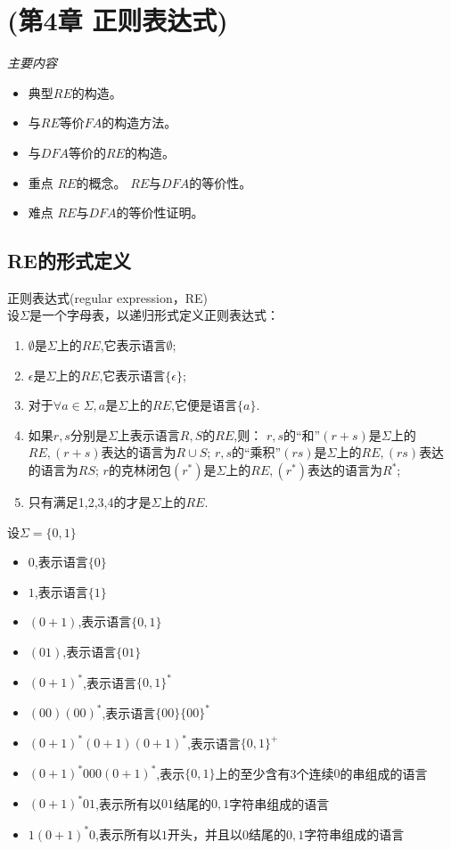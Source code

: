 \chapter{\cite{蒋宗礼2013}(第4章 正则表达式)}

\emph{主要内容}
\begin{itemize}
	\item 典型$RE$的构造。
	\item 与$RE$等价$FA$的构造方法。
	\item 与$DFA$等价的$RE$的构造。
	\item 重点
		\subitem{-} $RE$的概念。
		\subitem{-} $RE$与$DFA$的等价性。
	\item 难点
	    \subitem{-} $RE$与$DFA$的等价性证明。 
\end{itemize}

\section{RE的形式定义}
\begin{definition}\label{RE_Def} 正则表达式(regular expression，RE)\\
	设$\Sigma$是一个字母表，以递归形式定义正则表达式：
	\begin{enumerate}
		\item $\emptyset$是$\Sigma$上的$RE$,它表示语言$\emptyset$;
		\item $\epsilon$是$\Sigma$上的$RE$,它表示语言$\{\epsilon\}$;
		\item 对于$\forall a\in\Sigma,a$是$\Sigma$上的$RE$,它便是语言$\{a\}$.
		\item 如果$r,s$分别是$\Sigma$上表示语言$R,S$的$RE$,则：
			\subitem $r,s$的“和”$(r+s)$是$\Sigma$上的$RE,(r+s)$表达的语言为$R\cup S$;
			\subitem $r,s$的“乘积”$(rs)$是$\Sigma$上的$RE,(rs)$表达的语言为$RS$;
			\subitem $r$的克林闭包$(r^\ast)$是$\Sigma$上的$RE,(r^\ast)$表达的语言为$R^\ast$;
		\item 只有满足1,2,3,4的才是$\Sigma$上的$RE$.
	\end{enumerate}
\end{definition}

\begin{example} 设$\Sigma=\{0,1\}$
	\begin{itemize}
		\item $0$,表示语言$\{0\}$
		\item $1$,表示语言$\{1\}$
		\item $(0+1)$,表示语言$\{0,1\}$
		\item $(01)$,表示语言$\{01\}$
		\item $(0+1)^\ast$,表示语言$\{0,1\}^\ast$
		\item $(00)(00)^\ast$,表示语言$\{00\}\{00\}^\ast$
		\item $(0+1)^\ast(0+1)(0+1)^\ast$,表示语言$\{0,1\}^+$
		\item $(0+1)^\ast000(0+1)^\ast$,表示$\{0,1\}$上的至少含有3个连续$0$的串组成的语言
		\item $(0+1)^\ast01$,表示所有以$01$结尾的$0,1$字符串组成的语言
		\item $1(0+1)^\ast0$,表示所有以$1$开头，并且以$0$结尾的$0,1$字符串组成的语言
	\end{itemize}
\end{example}

